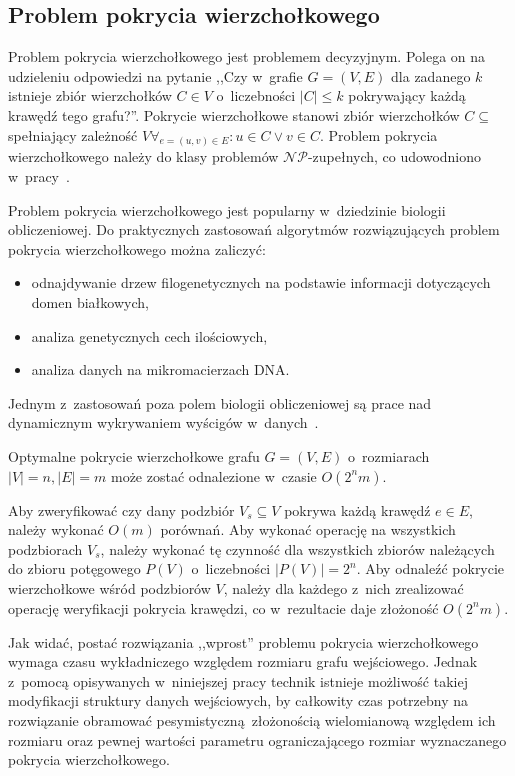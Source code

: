\subsection{Problem pokrycia wierzchołkowego}\label{s_vertex_cover_domain}
\par{
  Problem pokrycia wierzchołkowego jest problemem decyzyjnym.
  Polega on na udzieleniu odpowiedzi na pytanie ,,Czy w~grafie $G=(V,E)$ dla zadanego $k$
  istnieje zbiór wierzchołków $C \in V$ o~liczebności $|C| \leq k$ pokrywający każdą krawędź tego grafu?''.
  Pokrycie wierzchołkowe stanowi zbiór wierzchołków $C \subseteq$ spełniający zależność $V\forall_{e=(u,v) \in E}:u\in C\lor v\in C$.
  Problem pokrycia wierzchołkowego należy do klasy problemów $\mathcal{NP}$-zupełnych, co udowodniono w~pracy~\cite{Kar72}.
}
\par{
  Problem pokrycia wierzchołkowego jest popularny w~dziedzinie biologii obliczeniowej. 
  Do praktycznych zastosowań algorytmów rozwiązujących problem pokrycia wierzchołkowego można zaliczyć:
  \begin{itemize}
    \item odnajdywanie drzew filogenetycznych na podstawie informacji
      dotyczących domen białkowych,
    \item analiza genetycznych cech ilościowych,
    \item analiza danych na mikromacierzach DNA.\@
  \end{itemize}
  Jednym z~zastosowań poza polem biologii obliczeniowej są prace nad dynamicznym wykrywaniem wyścigów w~danych~\cite{O'Callahan:2003:HDD:781498.781528}.
}
\begin{theorem}
  Optymalne pokrycie wierzchołkowe grafu $G=(V,E)$ o~rozmiarach $|V|=n, |E|=m$ może zostać odnalezione w~czasie $O(2^{n}m)$.
\end{theorem}
\begin{bproof}
  Aby zweryfikować czy dany podzbiór $V_s \subseteq V$ pokrywa każdą krawędź
  $e \in E$, należy wykonać $O(m)$ porównań.
  Aby wykonać operację na wszystkich podzbiorach $V_s$, należy wykonać tę
  czynność dla wszystkich zbiorów należących do zbioru potęgowego 
  $P(V)$ o~liczebności $|P(V)| = 2^{n}$.
  Aby odnaleźć pokrycie wierzchołkowe wśród podzbiorów $V$, należy dla każdego z~nich zrealizować operację weryfikacji pokrycia krawędzi, co w~rezultacie daje 
  złożoność $O(2^{n}m)$.
\end{bproof}
\par{
  Jak widać, postać rozwiązania ,,wprost'' problemu pokrycia wierzchołkowego wymaga czasu wykładniczego względem rozmiaru grafu wejściowego.
  Jednak z~pomocą opisywanych w~niniejszej pracy technik istnieje możliwość takiej modyfikacji struktury danych wejściowych, by całkowity czas potrzebny na rozwiązanie obramować pesymistyczną~złożonością wielomianową względem ich rozmiaru oraz pewnej wartości parametru ograniczającego rozmiar wyznaczanego pokrycia wierzchołkowego.
}
